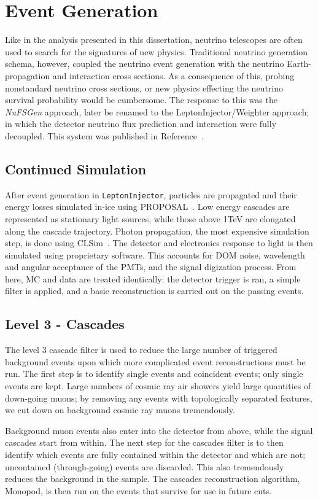 \documentclass[main.tex]{subfiles}
\begin{document}
\section{Event Generation}

Like in the analysis presented in this dissertation, neutrino telescopes are often used to search for the signatures of new physics. 
Traditional neutrino generation schema, however, coupled the neutrino event generation with the neutrino Earth-propagation and interaction cross sections.
As a consequence of this, probing nonstandard neutrino cross sections, or new physics effecting the neutrino survival probability would be cumbersome. 
The response to this was the \textit{NuFSGen} approach, later be renamed to the LeptonInjector/Weighter approach; in which the detector neutrino flux prediction and interaction were fully decoupled. 
This system was published in Reference~\cite{ABBASI2021108018}.

\subsection{Continued Simulation}

After event generation in \texttt{LeptonInjector}, particles are propagated and their energy losses simulated in-ice using PROPOSAL~\cite{Koehne:2013gpa}.
Low energy cascades are represented as stationary light sources, while those above 1TeV are elongated along the cascade trajectory. 
Photon propagation, the most expensive simulation step, is done using CLSim~\cite{CLSim}. 
The detector and electronics response to light is then simulated using proprietary software. 
This accounts for DOM noise, wavelength and angular acceptance of the PMTs, and the signal digization process.
From here, MC and data are treated identically: the detector trigger is ran, a simple filter is applied, and a basic reconstruction is carried out on the passing events. 

\subsection{Level 3 - Cascades}\label{sec:level3}

The level 3 cascade filter is used to reduce the large number of triggered background events upon which more complicated event reconstructions must be run. 
The first step is to identify single events and coincident events; only single events are kept. 
Large numbers of cosmic ray air showers yield large quantities of down-going muons; by removing any events with topologically separated features, we cut down on background cosmic ray muons tremendously. 

Background muon events also enter into the detector from above, while the signal cascades start from within.
The next step for the cascades filter is to then identify which events are fully contained within the detector and which are not; uncontained (through-going) events are discarded. 
This also tremendously reduces the background in the sample. 
The cascades reconstruction algorithm, Monopod, is then run on the events that survive for use in future cuts. 
\end{document}
